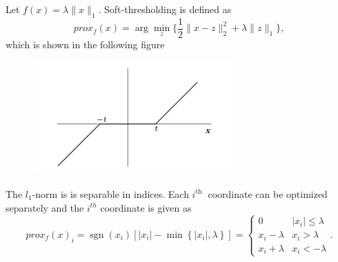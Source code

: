 %	
	
\begin{theorem}
Let $f(x)=\lambda\|x\|_1$. Soft-thresholding  is defined as 
\begin{equation}
prox_f(x) = \arg\min_z\{\frac{1}{2}\|x-z\|^2_2 + \lambda\|z\|_1 \},
\end{equation}
which is shown in the following figure
\begin{figure}
\centering
\includegraphics[width=3in]{./6DL/figures/softthreshold}   
\end{figure}
The $l_1$-norm is is separable in indices. Each $i^{\text {th }}$ coordinate can be optimized separately and the $i^{t h}$ coordinate is given as
$$
prox_f(x)_{i}=\operatorname{sgn}\left(x_{i}\right)\left[\left|x_{i}\right|-\min \left\{\left|x_{i}\right|, \lambda\right\}\right]
=\begin{cases}
0&|x_i|\le \lambda
\\
x_i-\lambda&x_i>\lambda
\\
x_i+\lambda&x_i<-\lambda
\end{cases}.
$$ 
\end{theorem}

